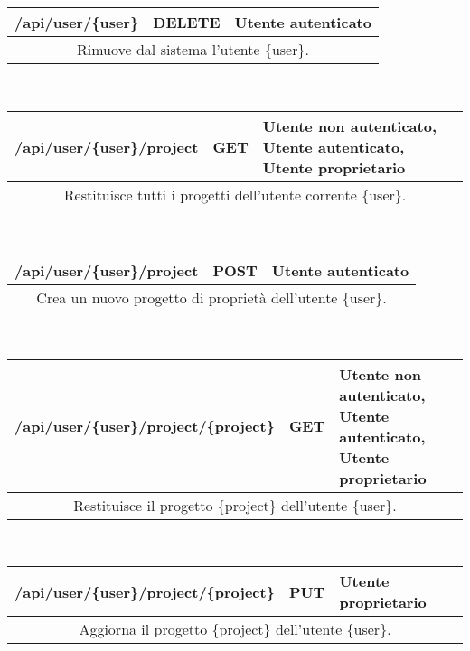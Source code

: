 \begin{table}[H]	
	

	\begin{tabular}{|p{}|p{}|p{}|}
		\toprule
		\textbf{/api/user/\{user\}} & \textbf{DELETE} & \textbf{Utente autenticato} \\ \midrule
		\multicolumn{3}{|c|}{Rimuove dal sistema l'utente \{user\}.} \\
		\bottomrule
	\end{tabular}\\
	\par\bigskip
	
	\begin{tabular}{|p{}|p{}|p{}|}
		\toprule
		\textbf{/api/user/\{user\}/project} & \textbf{GET} & \textbf{Utente non autenticato, Utente autenticato, Utente proprietario} \\ \midrule
		\multicolumn{3}{|c|}{Restituisce tutti i progetti dell'utente corrente \{user\}.} \\
		\bottomrule
	\end{tabular}\\
	\par\bigskip
	
		\begin{tabular}{|p{}|p{}|p{}|}
		\toprule
		\textbf{/api/user/\{user\}/project} & \textbf{POST} & \textbf{Utente autenticato} \\ \midrule
		\multicolumn{3}{|c|}{Crea un nuovo progetto di proprietà dell'utente \{user\}.} \\
		\bottomrule
	\end{tabular}\\
	\par\bigskip
	
	\begin{tabular}{|p{}|p{}|p{}|}
		\toprule
		\textbf{/api/user/\{user\}/project/\{project\}} & \textbf{GET} & \textbf{Utente non autenticato, Utente autenticato, Utente proprietario} \\ \midrule
		\multicolumn{3}{|c|}{Restituisce il progetto \{project\} dell'utente \{user\}.} \\
		\bottomrule
	\end{tabular}\\
	\par\bigskip
	
	\begin{tabular}{|p{}|p{}|p{}|}
		\toprule
		\textbf{/api/user/\{user\}/project/\{project\}} & \textbf{PUT} & \textbf{Utente proprietario} \\ \midrule
		\multicolumn{3}{|c|}{Aggiorna il progetto \{project\} dell'utente \{user\}.} \\
		\bottomrule
	\end{tabular}\\
	\par\bigskip
	

\end{table}
